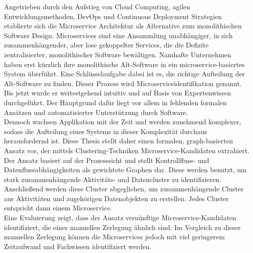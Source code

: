 
\Abstract
Angetrieben durch den Aufstieg von Cloud Computing, agilen Entwicklungsmethoden, DevOps und Continuous Deployment Strategien etablierte sich die Microservice Architektur als Alternative zum monolithischen Software Design. Microservices sind eine Ansammlung unabhängiger, in sich zusammenhängender, aber lose gekoppelter Services, die die Defizite zentralisierter, monolithischer Software bewältigen. Namhafte Unternehmen haben erst kürzlich ihre monolithische Alt-Software in ein microservice-basiertes System überführt. Eine Schlüsselaufgabe dabei ist es, die richtige Aufteilung der Alt-Software zu finden. Dieser Prozess wird Microserviceidentifikation genannt. Bis jetzt wurde er weitestgehend intuitiv und auf Basis von Expertenwissen durchgeführt. Der Hauptgrund dafür liegt vor allem in fehlenden formalen Ansätzen und automatisierter Unterstützung durch Software.\\
Dennoch wachsen Applikation mit der Zeit und werden zunehmend komplexer, sodass die Aufteilung eines Systems in dieser Komplexität durchaus herausfordernd ist. Diese Thesis stellt daher einen formalen, graph-basierten Ansatz vor, der mittels Clustering-Techniken Microservice-Kandidaten extrahiert. Der Ansatz basiert auf der Prozesssicht und stellt Kontrollfluss- und Datenflussabhängigkeiten als gewichtete Graphen dar. Diese werden benutzt, um stark zusammenhängende Aktivitäts- und Datencluster zu identifizieren. Anschließend werden diese Cluster abgeglichen, um zusammenhängende Cluster aus Aktivitäten und zugehörigen Datenobjekten zu erstellen. Jedes Cluster entspricht dann einem Microservice. \\
Eine Evaluierung zeigt, dass der Ansatz vernünftige Microservice-Kandidaten identifiziert, die einer manuellen Zerlegung ähnlich sind. Im Vergleich zu dieser manuellen Zerlegung können die Microservices jedoch mit viel geringerem Zeitaufwand und Fachwissen identifiziert werden.

